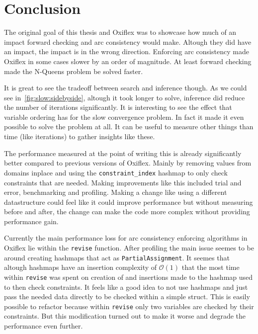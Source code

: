 
\chapter{Conclusion} \label{chap:conclusion}

The original goal of this thesis and Oxiflex was to showcase how much of an impact forward checking and arc consistency would make. Altough they did have an impact, the impact is in the wrong direction. Enforcing arc consistency made Oxiflex in some cases slower by an order of magnitude. At least forward checking made the N-Queens problem be solved faster.

It is great to see the tradeoff between search and inference though. As we could see in~\cref{fig:slow:sidebyside}, altough it took longer to solve, inference did reduce the number of iterations significantly. It is interesting to see the effect that variable ordering has for the slow convergence problem. In fact it made it even possible to solve the problem at all. It can be useful to measure other things than time (like iterations) to gather insights like these.

The performance measured at the point of writing this is already significantly better compared to previous versions of Oxiflex. Mainly by removing values from domains inplace and using the \verb|constraint_index| hashmap to only check constraints that are needed. Making improvements like this included trial and error, benchmarking and profiling. Making a change like using a different datastructure could feel like it could improve performance but without measuring before and after, the change can make the code more complex without providing performance gain.

Currently the main performance loss for arc consistency enforcing algorithms in Oxiflex lie within the \verb|revise| function. After profiling the main issue seemes to be around creating hashmaps that act as \verb|PartialAssignment|. It seemes that altough hashmaps have an insertion complexity of $\mathcal{O}(1)$ that the most time within \verb|revise| was spent on creation of and insertions made to the hashmap used to then check constraints. It feels like a good idea to not use hashmaps and just pass the needed data directly to be checked within a simple struct. This is easily possible to refactor because within \verb|revise| only two variables are checked by their constraints. But this modification turned out to make it worse and degrade the performance even further.

